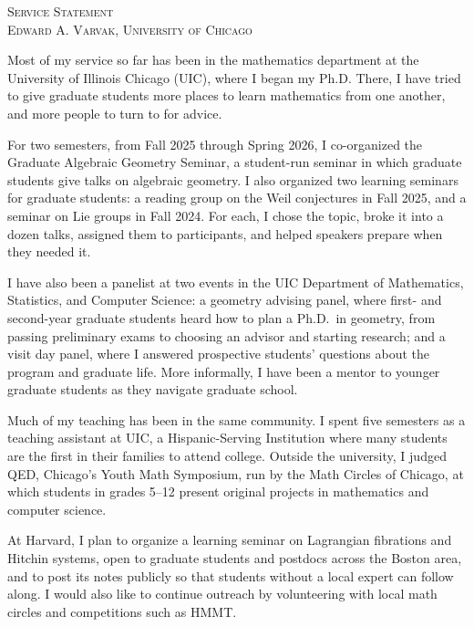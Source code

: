 \documentclass[12pt]{amsart}
\begin{document}
\begin{center}
  {\large\textsc{Service Statement}}\\[5pt]
  \small\textsc{Edward A. Varvak, University of Chicago}
\end{center}

Most of my service so far has been in the mathematics department at the
University of Illinois Chicago (UIC), where I began my Ph.D. There, I have
tried to give graduate students more places to learn mathematics from one
another, and more people to turn to for advice.

For two semesters, from Fall 2025 through Spring 2026, I co-organized the
Graduate Algebraic Geometry Seminar, a student-run seminar in which graduate
students give talks on algebraic geometry. I also organized two learning
seminars for graduate students: a reading group on the Weil conjectures in
Fall 2025, and a seminar on Lie groups in Fall 2024. For each, I chose the
topic, broke it into a dozen talks, assigned them to participants, and
helped speakers prepare when they needed it.

I have also been a panelist at two events in the UIC Department of
Mathematics, Statistics, and Computer Science: a geometry advising panel,
where first- and second-year graduate students heard how to plan a Ph.D.\ in
geometry, from passing preliminary exams to choosing an advisor and starting
research; and a visit day panel, where I answered prospective students'
questions about the program and graduate life. More informally, I have been a
mentor to younger graduate students as they navigate graduate school.

Much of my teaching has been in the same community. I spent five semesters
as a teaching assistant at UIC, a Hispanic-Serving Institution where many
students are the first in their families to attend college. Outside the
university, I judged QED, Chicago's Youth Math Symposium, run by the Math
Circles of Chicago, at which students in grades 5--12 present original
projects in mathematics and computer science.

At Harvard, I plan to organize a learning seminar on Lagrangian fibrations
and Hitchin systems, open to graduate students and postdocs across the
Boston area, and to post its notes publicly so that students without a local
expert can follow along. I would also like to continue outreach by
volunteering with local math circles and competitions such as HMMT.
\end{document}
